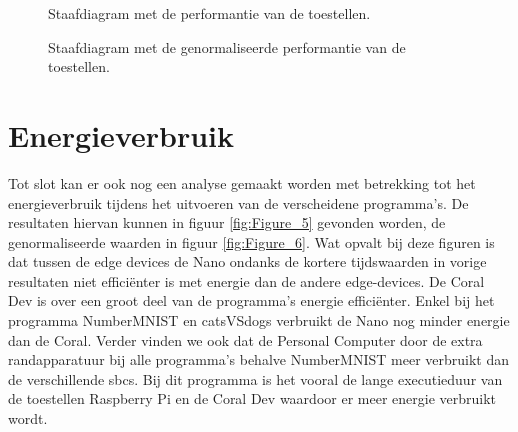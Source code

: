 	\begin{figure}
		\caption{Staafdiagram met de performantie van de toestellen.}
		\label{fig:Figure_3}
	\end{figure}

	\begin{figure}
		\caption{Staafdiagram met de genormaliseerde performantie van de toestellen.}
		\label{fig:Figure_4}
	\end{figure}

\newpage

	\section{Energieverbruik}
	Tot slot kan er ook nog een analyse gemaakt worden met betrekking tot het energieverbruik tijdens het uitvoeren van de verscheidene programma's. De resultaten hiervan kunnen in figuur \ref{fig:Figure_5} gevonden worden, de genormaliseerde waarden in figuur \ref{fig:Figure_6}. Wat opvalt bij deze figuren is dat tussen de edge devices de Nano ondanks de kortere tijdswaarden in vorige resultaten niet effici\"enter is met energie dan de andere edge-devices. De Coral Dev is over een groot deel van de programma's energie effici\"enter. Enkel bij het programma NumberMNIST en catsVSdogs verbruikt de Nano nog minder energie dan de Coral. 
	Verder vinden we ook dat de Personal Computer door de extra randapparatuur bij alle programma's behalve NumberMNIST meer verbruikt dan de verschillende \gls{sbc}s. Bij dit programma is het vooral de lange executieduur van de toestellen Raspberry Pi en de Coral Dev waardoor er meer energie verbruikt wordt. 
	
